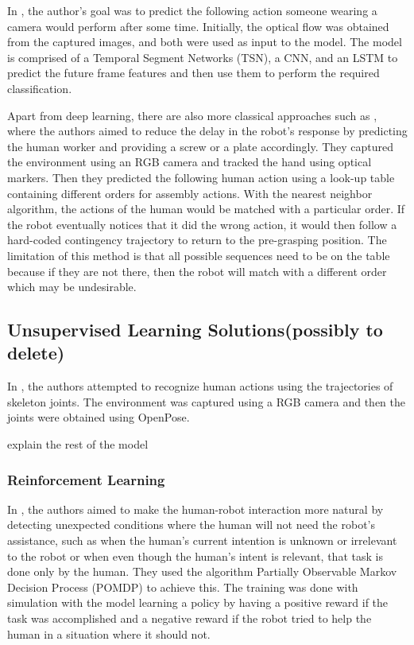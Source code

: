 In \cite{Wu2021}, the author's goal was to predict the following action someone wearing a camera would perform after some time. Initially, the optical flow was obtained from the captured images, and both were used as input to the model. The model is comprised of a Temporal Segment Networks (TSN), a CNN, and an LSTM to predict the future frame features and then use them to perform the required classification.

Apart from deep learning, there are also more classical approaches such as \cite{Maeda2016}, where the authors aimed to reduce the delay in the robot's response by predicting the human worker and providing a screw or a plate accordingly. They captured the environment using an RGB camera and tracked the hand using optical markers. Then they predicted the following human action using a look-up table containing different orders for assembly actions. With the nearest neighbor algorithm, the actions of the human would be matched with a particular order. If the robot eventually notices that it did the wrong action, it would then follow a hard-coded contingency trajectory to return to the pre-grasping position. The limitation of this method is that all possible sequences need to be on the table because if they are not there, then the robot will match with a different order which may be undesirable.

{\color{red}
\subsection{Unsupervised Learning Solutions(possibly to delete)}

In \cite{Kato2018}, the authors attempted to recognize human actions using the trajectories of skeleton joints. The environment was captured using a RGB camera and then the joints were obtained using OpenPose.
}

{\color{red} explain the rest of the model} 
\fi

\subsubsection{Reinforcement Learning}

In \cite{Gorur2018}, the authors aimed to make the human-robot interaction more natural by detecting unexpected conditions where the human will not need the robot's assistance, such as when the human's current intention is unknown or irrelevant to the robot or when even though the human's intent is relevant, that task is done only by the human. They used the algorithm Partially Observable Markov Decision Process (POMDP) to achieve this. The training was done with simulation with the model learning a policy by having a positive reward if the task was accomplished and a negative reward if the robot tried to help the human in a situation where it should not.

